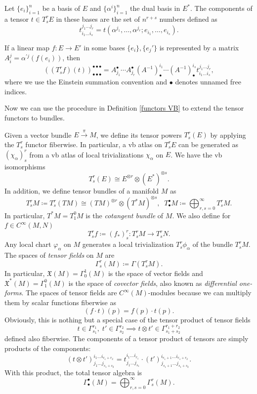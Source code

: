 \documentclass[english,letterpaper]{article}%
\numberwithin{equation}{section}
\numberwithin{figure}{section}
\numberwithin{table}{section}
\theoremstyle{definition}
\theoremstyle{definition}
\theoremstyle{definition}
\theoremstyle{plain}
\theoremstyle{plain}
\theoremstyle{plain}
\theoremstyle{plain}
\theoremstyle{remark}
\theoremstyle{remark}
\newcommand{\fX}{\mathfrak{X}}
\begin{document}
\begin{defn}
    Let $\{e_i\}_{i=1}^n$ be a basis of $E$ and $\{\alpha^i\}_{i=1}^n$ the dual basis in $E^\ast$. The components of a tensor $t\in T^r_s E$ in these bases are the set of $n^{r+s}$ numbers defined as
    \[
    t_{i_1\ldots i_s}^{j_1\ldots j_r}=t\left(\alpha^{j_1},\ldots,\alpha^{j_r};e_{i_1},\ldots,e_{i_s}\right).
    \]
\end{defn}

If a linear map $f:E\to E'$ in some bases $\{e_i\},\{e_j'\}$ is represented by a matrix $A_i^j=\alpha^{\prime j} (f(e_i))$, then 
\[
\left(\left(T^r_s f\right)(t)\right)^{\bullet\bullet\bullet}_{\bullet\bullet\bullet}=A^\bullet_{j_1}\cdots A_{j_r}^\bullet \left(A^{-1}\right)^{i_1}_\bullet \cdots \left(A^{-1}\right)^{i_s}_\bullet t_{i_1\ldots i_s}^{j_1\ldots j_r},
\]
where we use the Einstein summation convention and $\bullet$ denotes unnamed free indices.

Now we can use the procedure in Definition \ref{functors VB} to extend the tensor functors to bundles.

\begin{defn}
    Given a vector bundle $E\overset{\pi}{\to}M$, we define its tensor powers $T^r_s (E)$ by applying the $T^r_s$ functor fiberwise. In particular, a \gls{vb} atlas on $T^r_s E$ can be generated as $(\chi_\alpha)^r_s$ from a \gls{vb} atlas of local trivializations $\chi_\alpha$ on $E$.
    We have the \gls{vb} isomorphisms
    \[
    T^r_s (E)\cong E^{\otimes r}\otimes \left(E^\ast\right)^{\otimes s}.
    \]
    In addition, we define tensor bundles of a manifold $M$ as
    \[
    T^r_s M\coloneqq T^r_s (TM)\cong (TM)^{\otimes r}\otimes (T^\ast M)^{\otimes s},\;\; T^\bullet_\bullet M\coloneqq \bigoplus_{r,s=0}^\infty T^r_s M.
    \]
    In particular, $T^\ast M=T^0_1 M$ is the \emph{cotangent bundle} of $M$. We also define for $f\in C^\infty(M,N)$ 
    \[ T^r_s f\coloneqq (f_\ast)^r_s: T^r_s M\to T^r_s N.\]
    Any local chart $\varphi_\alpha$ on $M$ generates a local trivialization $T^r_s \phi_\alpha$ of the bundle $T^r_s M$.
    The spaces of \emph{tensor fields} on $M$ are 
    \[
    \Gamma^r_s(M)\coloneqq \Gamma(T^r_s M).
    \]
    In particular, $\fX(M)=\Gamma^1_0(M)$ is the space of vector fields and $\fX^\ast(M)=\Gamma^0_1(M)$ is the space of \emph{covector fields}, also known as \emph{differential one-forms}. The spaces of tensor fields are $C^\infty(M)$-modules because we can multiply them by scalar functions fiberwise as
    \[
    (f\cdot t)(p)=f(p)\cdot t(p).
    \]
    Obviously, this is nothing but a special case of the tensor product of tensor fields
    \[t\in\Gamma^{r_1}_{s_1},\;t'\in\Gamma^{r_2}_{s_2}\implies t\otimes t' \in \Gamma^{r_1+r_2}_{s_1+s_2}\] defined also fiberwise. The components of a tensor product of tensors are simply products of the components:
    \[
    (t\otimes t')_{j_1 \ldots j_{s_1+s_2}}^{i_1\ldots i_{r_1+r_2}}=t_{j_1\ldots j_{s_1}}^{i_1\ldots i_{r_1}}\cdot (t')^{i_{r_1+1}\ldots i_{r_1+r_2}}_{j_{s_1+1}\ldots j_{s_1+s_2}}.
    \]
    With this product, the total tensor algebra is 
    \[\Gamma^\bullet_\bullet(M)=\bigoplus_{r,s=0}^\infty \Gamma^r_s(M).\]
\end{defn}
\end{document}
